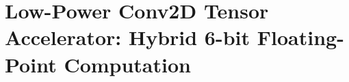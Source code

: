 \chapter{Low-Power Conv2D Tensor Accelerator: Hybrid 6-bit Floating-Point Computation}\label{chap.cnn}
\minitoc

%






